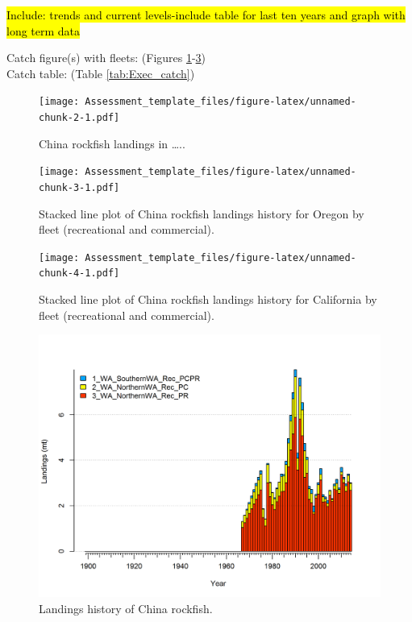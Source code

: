 \documentclass[12pt,]{article}
\begin{document}
\hl{Include: trends and current levels-include table for last ten years and graph with 
long term data}

Catch figure(s) with fleets: (Figures
\ref{fig:Exec_catch1}-\ref{fig:Exec_catch3})\\
Catch table: (Table \ref{tab:Exec_catch})

\FloatBarrier

\begin{figure}[htbp]
\centering
\texttt{[image: Assessment\_template\_files/figure-latex/unnamed-chunk-2-1.pdf]}
\caption{China rockfish landings in \ldots{}.. \label{fig:Exec_catch1}}
\end{figure}

\begin{figure}[htbp]
\centering
\texttt{[image: Assessment\_template\_files/figure-latex/unnamed-chunk-3-1.pdf]}
\caption{Stacked line plot of China rockfish landings history for Oregon
by fleet (recreational and commercial). \label{fig:Exec_catch2}}
\end{figure}

\begin{figure}[htbp]
\centering
\texttt{[image: Assessment\_template\_files/figure-latex/unnamed-chunk-4-1.pdf]}
\caption{Stacked line plot of China rockfish landings history for
California by fleet (recreational and commercial).
\label{fig:Exec_catch3}}
\end{figure}

\begin{figure}[htbp]
\centering
\includegraphics{r4ss/plots_mod1/catch2 landings stacked.png}
\caption{Landings history of China rockfish. \label{fig:r4ss_catches}}
\end{figure}
\end{document}
